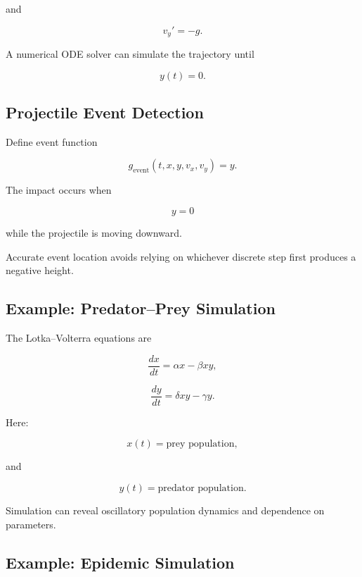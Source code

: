 and

\[
\boxed{
v_y'=-g.
}
\]

A numerical ODE solver can simulate the trajectory until

\[
y(t)=0.
\]

\subsection{Projectile Event Detection}
\label{subsec:projectile-event-detection}

Define event function

\[
\boxed{
g_{\mathrm{event}}(t,x,y,v_x,v_y)
=
y.
}
\]

The impact occurs when

\[
\boxed{
y=0
}
\]

while the projectile is moving downward.

Accurate event location avoids relying on whichever discrete step first
produces a negative height.

\subsection{Example: Predator--Prey Simulation}
\label{subsec:predator-prey-simulation}

The Lotka--Volterra equations are

\[
\boxed{
\frac{dx}{dt}
=
\alpha x-\beta xy,
}
\]

\[
\boxed{
\frac{dy}{dt}
=
\delta xy-\gamma y.
}
\]

Here:

\[
x(t)
=
\text{prey population},
\]

and

\[
y(t)
=
\text{predator population}.
\]

Simulation can reveal oscillatory population dynamics and dependence on
parameters.

\subsection{Example: Epidemic Simulation}
\label{subsec:epidemic-simulation}

